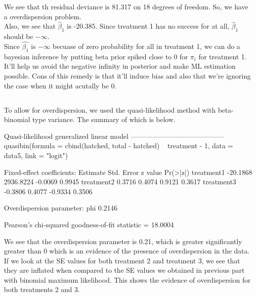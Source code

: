 \documentclass{article}
\begin{document}
We see that th residual deviance is 81.317 on 18 degrees of freedom. So, we have a overdispersion problem.\\

Also, we see that $\hat{\beta}_1$ is -20.385. Since treatment 1 has no success for at all, $\hat{\beta}_1$ should be $-\infty$.\\

Since $\hat{\beta_1}$ is $-\infty$ becuase of zero probability for all in treatment 1, we can do a bayesian inference by putting beta prior spiked close to 0 for $\pi_i$ for treatment 1. It'll help us avoid the negative infinity in posterior and make ML estimation possible. Cons of this remedy is that it'll induce bias and also that we're ignoring the case when it might acutally be 0.\\

\subsection{}
To allow for overdispersion, we used the quasi-likelihood method with beta-binomial type variance. The summary of which is below.
\begin{Schunk}
\begin{Soutput}
Quasi-likelihood generalized linear model
-----------------------------------------
quasibin(formula = cbind(hatched, total - hatched) ~ treatment - 
    1, data = data5, link = "logit")

Fixed-effect coefficients:
           Estimate Std. Error z value Pr(>|z|)
treatment1 -20.1868  2936.8224 -0.0069   0.9945
treatment2   0.3716     0.4074  0.9121   0.3617
treatment3  -0.3806     0.4077 -0.9334   0.3506

Overdispersion parameter:
   phi 
0.2146 

Pearson's chi-squared goodness-of-fit statistic = 18.0004 
\end{Soutput}
\end{Schunk}
We see that the overdispersion parameter is 0.21, which is greater significantly greater than 0 which is an evidence of the presence of overdispersion in the data.\\
If we look at the SE values for both treatment 2 and treatment 3, we see that they are inflated when compared to the SE values we obtained in previous part with binomial maximum likelihood. This shows the evidence of overdispersion for both treatments 2 and 3.


\subsection{}
\end{document}
